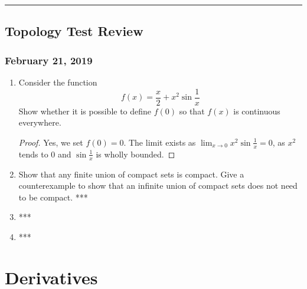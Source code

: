 \hrule

\subsection{Topology Test Review}
\subsubsection*{February 21, 2019}

\begin{enumerate}[1.]
  \item Consider the function
  \[f(x)=\frac{x}{2}+x^2\sin \frac{1}{x}\]
  Show whether it is possible to define $f(0)$ so that $f(x)$ is continuous everywhere.

  \begin{proof}
    Yes, we set $f(0) = 0$. The limit exists as $\lim_{x\to 0} x^2\sin\frac{1}{x}=0$, as $x^2$ tends to $0$ and $\sin\frac{1}{x}$ is wholly bounded.
  \end{proof}

  \item Show that any finite union of compact sets is compact. Give a counterexample to show that an infinite union of compact sets does not need to be compact. ***

  \item ***

  \item ***
\end{enumerate}

\newpage
\section{Derivatives}
